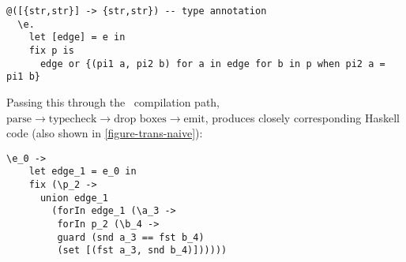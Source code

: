 \begin{lstlisting}[language=datafun]
  @([{str,str}] -> {str,str}) -- type annotation
  \e.
    let [edge] = e in
    fix p is
      edge or {(pi1 a, pi2 b) for a in edge for b in p when pi2 a = pi1 b}
\end{lstlisting}


\noindent
Passing this through the \naive\ compilation path, {\sffamily\itshape$\text{parse} \to \text{typecheck} \to \text{drop boxes} \to \text{emit}$}, produces closely corresponding Haskell code (also shown in \cref{figure-trans-naive}):

\begin{lstlisting}[emph={fix,union,forIn,guard,set}]
  \e_0 ->
    let edge_1 = e_0 in
    fix (\p_2 ->
      union edge_1
        (forIn edge_1 (\a_3 ->
         forIn p_2 (\b_4 ->
         guard (snd a_3 == fst b_4)
         (set [(fst a_3, snd b_4)])))))
\end{lstlisting}


